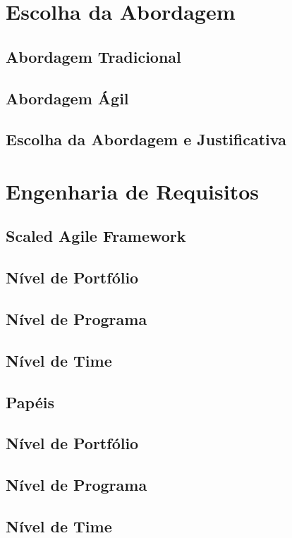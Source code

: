 \chapter[Escolha da Abordagem]{Escolha da Abordagem}

\section{Abordagem Tradicional}
\section{Abordagem Ágil}
\section{Escolha da Abordagem e Justificativa}

\chapter[Engenharia de Requisitos]{Engenharia de Requisitos}

\section{Scaled Agile Framework}
\section{Nível de Portfólio}
\section{Nível de Programa}
\section{Nível de Time}

\section{Papéis}
\section{Nível de Portfólio}
\section{Nível de Programa}
\section{Nível de Time}

